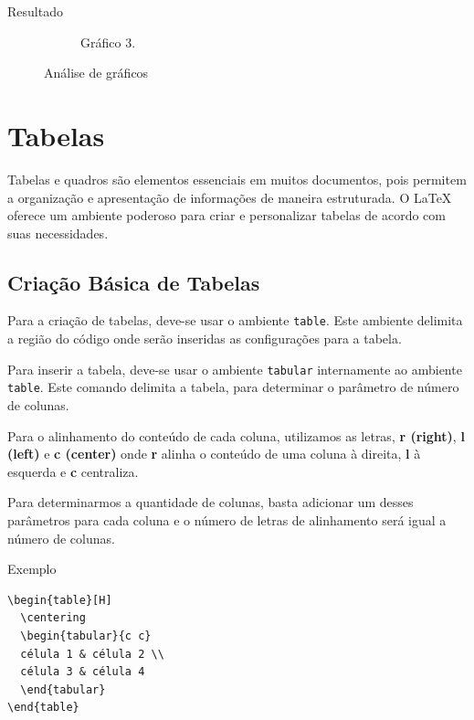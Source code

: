 \begin{trailer}{Resultado}
\begin{figure}[H]
\begin{subfigure}[b]{0.4\textwidth}
        \caption{Gr\'afico 3.}
    \end{subfigure}

    \caption{An\'alise de gr\'aficos}
    \label{fig:subcaption_example}
\end{figure}    
\end{trailer}

\section{Tabelas}
\label{sec:2}

Tabelas e quadros são elementos essenciais em muitos documentos, pois permitem a organização e apresentação de informações de maneira estruturada. O LaTeX oferece um ambiente poderoso para criar e personalizar tabelas de acordo com suas necessidades.

\subsection{Criação Básica de Tabelas}

Para a cria\c c\~ao de tabelas, deve-se usar o ambiente \texttt{table}. Este ambiente delimita a regi\~ao do c\'odigo onde ser\~ao inseridas as configura\c c\~oes para a tabela. 

\noindent Para inserir a tabela, deve-se usar o ambiente \texttt{tabular} internamente ao ambiente \texttt{table}. Este comando delimita a tabela, para determinar o par\^ametro de n\'umero de colunas. 

\noindent Para o alinhamento do conte\'udo de cada coluna, utilizamos as letras, \textbf{r (right)}, \textbf{l (left)} e \textbf{c (center)} onde \textbf{r} alinha o conteúdo de uma coluna à direita, \textbf{l} à esquerda e
\textbf{c} centraliza. 

\noindent Para determinarmos a quantidade de colunas, basta adicionar um desses par\^ametros para cada coluna e o número de letras de alinhamento ser\'a igual a n\'umero de colunas.

\begin{trailer}{Exemplo}
\begin{verbatim}
\begin{table}[H]
  \centering
  \begin{tabular}{c c}
  célula 1 & célula 2 \\
  célula 3 & célula 4
  \end{tabular}
\end{table}
\end{verbatim}    
\end{trailer}

